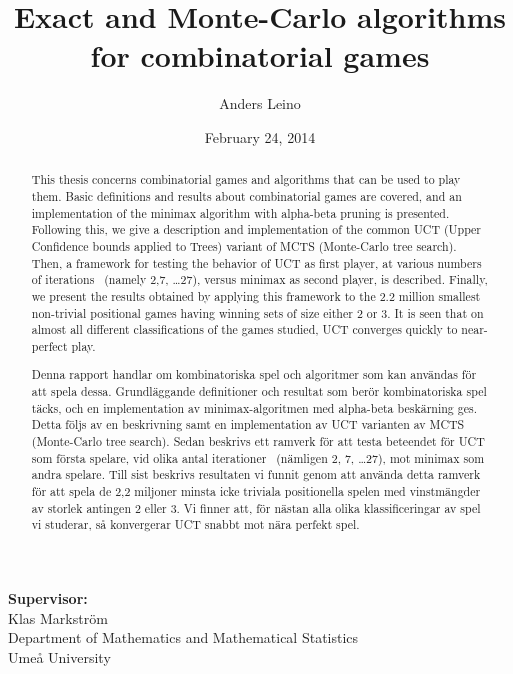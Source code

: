 \documentclass[12pt]{article}
\begin{document}
\title{Exact and Monte-Carlo algorithms for combinatorial games}
\date{February 24, 2014}
\author{Anders Leino}
\maketitle
\begin{abstract}
This thesis concerns combinatorial games and algorithms that can be used to play them.
Basic definitions and results about combinatorial games are covered, and an implementation of the minimax algorithm with alpha-beta pruning is presented.
Following this, we give a description and implementation of the common UCT (Upper Confidence bounds applied to Trees) variant of MCTS (Monte-Carlo tree search).
Then, a framework for testing the behavior of UCT as first player, at various numbers of iterations ~(namely 2,7, \dots 27), versus minimax as second player, is described.
Finally, we present the results obtained by applying this framework to the 2.2 million smallest non-trivial positional games having winning sets of size either 2 or 3.
It is seen that on almost all different classifications of the games studied, UCT converges quickly to near-perfect play.
\end{abstract}
\vfill
\begin{center}
\begin{minipage}[adjusting]{300pt}
\tiny
\textbf{Supervisor:} \\
Klas Markström \\
Department of Mathematics and Mathematical Statistics \\
Umeå University \\
\end{minipage} 
\end{center}
\pagebreak
\renewcommand{\abstractname}{Exakta och Monte-Carlo algoritmer för kombinatoriska spel}
\begin{abstract}
Denna rapport handlar om kombinatoriska spel och algoritmer som kan användas för att spela dessa.
Grundläggande definitioner och resultat som berör kombinatoriska spel täcks, och en implementation av minimax-algoritmen med alpha-beta beskärning ges.
Detta följs av en beskrivning samt en implementation av UCT varianten av MCTS (Monte-Carlo tree search).
Sedan beskrivs ett ramverk för att testa beteendet för UCT som första spelare, vid olika antal iterationer ~(nämligen 2, 7, \dots 27), mot minimax som andra spelare.
Till sist beskrivs resultaten vi funnit genom att använda detta ramverk för att spela de 2,2 miljoner minsta icke triviala positionella spelen med vinstmängder av storlek antingen 2 eller 3.
Vi finner att, för nästan alla olika klassificeringar av spel vi studerar, så konvergerar UCT snabbt mot nära perfekt spel.
\end{abstract}
\pagebreak
\tableofcontents
\pagebreak
\end{document}
